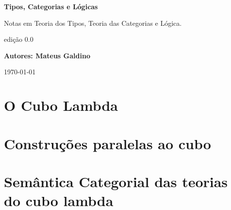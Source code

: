 \documentclass[a4paper]{article}
\theoremstyle{definition}
\begin{document}
    \begin{titlepage}
        \begin{center}
            \vspace*{1cm}
    
            \Huge
            \textbf{Tipos, Categorias e Lógicas}
    
            \vspace{0.5cm}
            \large
            Notas em Teoria dos Tipos, Teoria das Categorias e Lógica.
                  
            \vfill



            \Large
            edição \textbf{$0.0$}

            \textbf{Autores: Mateus Galdino}

            \today
                
        \end{center}
    \end{titlepage}

    \begingroup
        \hypersetup{hidelinks}    
        \tableofcontents

    \endgroup


    \newpage

        

    \newpage


        \part{O Cubo Lambda}
            \setcounter{section}{0}
            \renewcommand*{\theHsection}{chX.\the\value{section}}

            
            \newpage
            
            \newpage
            
            \newpage
            
            \newpage
            

    \newpage

        \part{Construções paralelas ao cubo}

    \newpage

        \part{Semântica Categorial das teorias do cubo lambda}
            \setcounter{section}{0}
            \renewcommand*{\theHsection}{chX.\the\value{section}}
\end{document}
